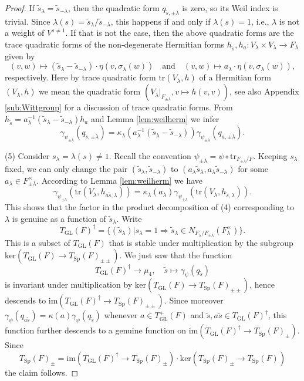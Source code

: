\documentclass{article}
\def\tx#1{\textrm{#1}}
\DeclareMathOperator{\Sp}{Sp}
\DeclareMathOperator{\GL}{GL}
\theoremstyle{definition}
\numberwithin{equation}{subsection}
\renewcommand{\-}{\hyp{}}
\begin{document}
\begin{proof}
	If $\tilde s_\lambda=\tilde s_{-\lambda}$, then the quadratic form $q_{\tilde s,\pm\lambda}$ is zero, so its Weil index is trivial. Since $\lambda(s)=\tilde s_\lambda / \tilde s_{-\lambda}$, this happens if and only if  $\lambda(s)=1$, i.e., $\lambda$ is not a weight of $V^{s \neq 1}$. If that is not the case, then the above quadratic forms are the trace quadratic forms
of the non-degenerate Hermitian forms $h_{\tilde s},h_a : V_\lambda \times V_\lambda \to F_\lambda$ given by 
	\[ (v,w) \mapsto (\tilde s_\lambda-\tilde s_{-\lambda})\cdot\eta(v,\sigma_\lambda(w))\quad\tx{and}\quad (v,w) \mapsto a_\lambda\cdot\eta(v,\sigma_\lambda(w)), \]
	respectively. Here by trace quadratic form $\mathrm{tr}(V_\lambda, h)$ of a Hermitian form $(V_\lambda, h)$ we mean the quadratic form $(V_\lambda|_{F_{\pm \lambda}}, v \mapsto h(v,v))$, see also Appendix \ref{sub:Wittgroup} for a discussion of trace quadratic forms.
	From $h_{\tilde s}=a_\lambda^{-1}(\tilde s_\lambda-\tilde s_{-\lambda})h_a$ and Lemma \ref{lem:weilherm} we infer 
	\[ \gamma_{\psi_{\pm\lambda}}(q_{\tilde s,\pm\lambda})=\kappa_{\lambda}(a_\lambda^{-1}(\tilde s_\lambda-\tilde s_{-\lambda}))\gamma_{\psi_{\pm\lambda}}(q_{a,\pm\lambda}). \]

	(5) Consider $s_\lambda=\lambda(s) \neq 1$. Recall the convention $\psi_{\pm\lambda}=\psi\circ\tx{tr}_{F_{\pm\lambda}/F}$. Keeping $s_\lambda$ fixed, we can only change the pair $(\tilde s_\lambda,\tilde s_{-\lambda})$ to $(a_\lambda\tilde s_\lambda,a_\lambda\tilde s_{-\lambda})$ for some $a_\lambda \in F_{\pm\lambda}^\times$. According to Lemma \ref{lem:weilherm} we have 
	\[ \gamma_{\psi_{\pm\lambda}}(\tx{tr}(V_\lambda,h_{a\tilde s,\lambda})) = \kappa_\lambda(a_\lambda)\gamma_{\psi_{\pm\lambda}}(\tx{tr}(V_\lambda,h_{\tilde s,\lambda})).\]
	This shows that the factor in the product decomposition of (4) corresponding to $\lambda$ is genuine as a function of $\tilde s_\lambda$. Write 
	\[ T_{\GL}(F)^{\dagger}=\{(\tilde s_\lambda)|s_\lambda = 1 \Rightarrow \tilde s_\lambda \in N_{F_\lambda/F_{\pm\lambda}}(F_\lambda^\times)\}. \]
	This is a subset of $T_{\GL}(F)$ that is stable under multiplication by the subgroup $\tx{ker}(T_{\GL}(F) \to T_{\Sp}(F)_{\pm\pm})$. We just saw that the function 
	\[ T_{\GL}(F)^{\dagger} \to \mu_4, \quad \tilde s \mapsto \gamma_\psi(q_{\tilde s}) \] 
	is invariant under multiplication by $\tx{ker}(T_{\GL}(F) \to T_{\Sp}(F)_{\pm\pm})$, hence descends to $\tx{im}(T_{\GL}(F)^\dagger \to T_{\Sp}(F)_{\pm\pm})$. Since moreover $\gamma_\psi(q_{a\tilde s})=\kappa(a)\gamma_\psi(q_{\tilde s})$ whenever $a \in T_{\GL}^+(F)$ and $\tilde s,a\tilde s \in T_{\GL}(F)^\dagger$, this function further descends to a genuine function on $\tx{im}(T_{\GL}(F)^\dagger \to T_{\Sp}(F)_{\pm})$. Since 
	\[ T_{\Sp}(F)_\pm = \tx{im}(T_{\GL}(F)^\dagger \to T_{\Sp}(F)_\pm) \cdot \tx{ker}(T_{\Sp}(F)_\pm \to T_{\Sp}(F)) \]
	the claim follows.
\end{proof}
\end{document}
